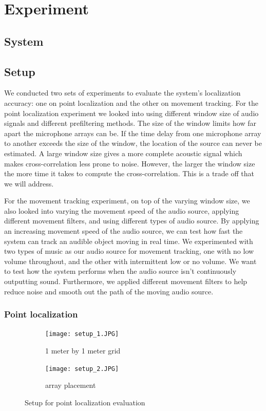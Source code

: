 \chapter{Experiment}
\section{System}

\clearpage

\section{Setup}

We conducted two sets of experiments to evaluate the system's localization accuracy: one on point localization and the other on movement tracking. For the point localization experiment we looked into using different window size of audio signals and different prefiltering methods. The size of the window limits how far apart the microphone arrays can be. If the time delay from one microphone array to another exceeds the size of the window, the location of the source can never be estimated. A large window size gives a more complete acoustic signal which makes cross-correlation less prone to noise. However, the larger the window size the more time it takes to compute the cross-correlation. This is a trade off that we will address.  

For the movement tracking experiment, on top of the varying window size, we also looked into varying the movement speed of the audio source, applying different movement filters, and using different types of audio source. By applying an increasing movement speed of the audio source, we can test how fast the system can track an audible object moving in real time. We experimented with two types of music as our audio source for movement tracking, one with no low volume throughout, and the other with intermittent low or no volume. We want to test how the system performs when the audio source isn't continuously outputting sound. Furthermore, we applied different movement filters to help reduce noise and smooth out the path of the moving audio source.  

\subsection{Point localization}

\begin{figure}[h!]
  \centering
  \begin{subfigure}[]{.48\textwidth}
    \texttt{[image: setup\_1.JPG]}
    \caption{1 meter by 1 meter grid}
  \end{subfigure}
  \begin{subfigure}[]{.48\textwidth}
    \texttt{[image: setup\_2.JPG]}
    \caption{array placement}
  \end{subfigure}
  \caption{Setup for point localization evaluation}
  \label{fig:setup_point}
\end{figure}

